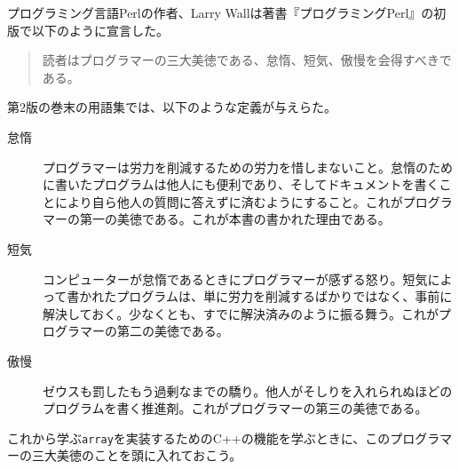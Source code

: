 
プログラミング言語Perlの作者、Larry Wallは著書『プログラミングPerl』の初版で以下のように宣言した。

\begin{quote}
読者はプログラマーの三大美徳である、怠惰、短気、傲慢を会得すべきである。
\end{quote}

第2版の巻末の用語集では、以下のような定義が与えらた。

\begin{description}
\item[怠惰]
プログラマーは労力を削減するための労力を惜しまないこと。怠惰のために書いたプログラムは他人にも便利であり、そしてドキュメントを書くことにより自ら他人の質問に答えずに済むようにすること。これがプログラマーの第一の美徳である。これが本書の書かれた理由である。
\item[短気]
コンピューターが怠惰であるときにプログラマーが感ずる怒り。短気によって書かれたプログラムは、単に労力を削減するばかりではなく、事前に解決しておく。少なくとも、すでに解決済みのように振る舞う。これがプログラマーの第二の美徳である。
\item[傲慢]
ゼウスも罰したもう過剰なまでの驕り。他人がそしりを入れられぬほどのプログラムを書く推進剤。これがプログラマーの第三の美徳である。
\end{description}

これから学ぶ\texttt{array}を実装するためのC++の機能を学ぶときに、このプログラマーの三大美徳のことを頭に入れておこう。
